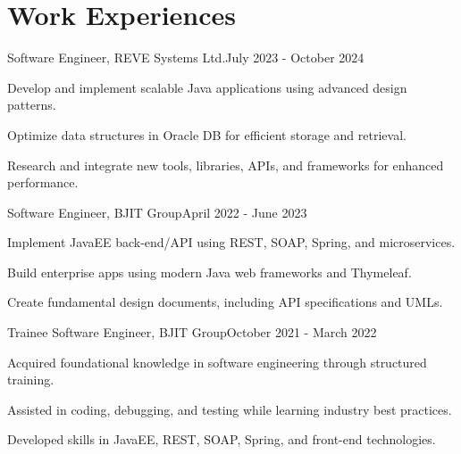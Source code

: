 \section{\textbf{Work Experiences}}
\begin{joblong}
{Software Engineer, REVE Systems Ltd.}{July 2023 - October 2024}
    \item Develop and implement scalable Java applications using advanced design patterns.
    \item Optimize data structures in Oracle DB for efficient storage and retrieval.
    \item Research and integrate new tools, libraries, APIs, and frameworks for enhanced performance.
\end{joblong}

\begin{joblong}
{Software Engineer, BJIT Group}{April 2022 - June 2023}
    \item Implement JavaEE back-end/API using REST, SOAP, Spring, and microservices.
    \item Build enterprise apps using modern Java web frameworks and Thymeleaf.
    \item Create fundamental design documents, including API specifications and UMLs.
\end{joblong}

\begin{joblong}
{Trainee Software Engineer, BJIT Group}{October 2021 - March 2022}
    \item Acquired foundational knowledge in software engineering through structured training.
    \item Assisted in coding, debugging, and testing while learning industry best practices.
    \item Developed skills in JavaEE, REST, SOAP, Spring, and front-end technologies.
\end{joblong}
